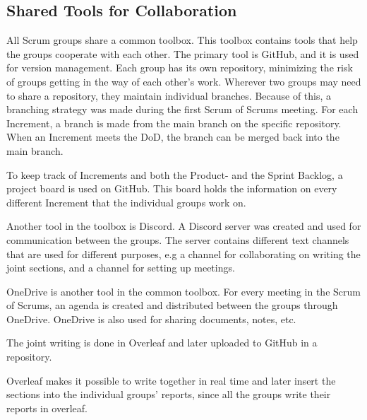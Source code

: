 \subsection{Shared Tools for Collaboration}\label{sub:shared-tools-for-collaboration}
All Scrum groups share a common toolbox.
This toolbox contains tools that help the groups cooperate with each other.
The primary tool is GitHub, and it is used for version management.  
Each group has its own repository, minimizing the risk of groups getting in the way of each other's work.
Wherever two groups may need to share a repository, they maintain individual branches.
Because of this, a branching strategy was made during the first Scrum of Scrums meeting.
For each Increment, a branch is made from the main branch on the specific repository. 
When an Increment meets the DoD, the branch can be merged back into the main branch.

To keep track of Increments and both the Product- and the Sprint Backlog, a project board is used on GitHub.
This board holds the information on every different Increment that the individual groups work on.

Another tool in the toolbox is Discord.
A Discord server was created and used for communication between the groups.
The server contains different text channels that are used for different purposes, e.g a channel for collaborating on writing the joint sections, and a channel for setting up meetings.

OneDrive is another tool in the common toolbox.
For every meeting in the Scrum of Scrums, an agenda is created and distributed between the groups through OneDrive.
OneDrive is also used for sharing documents, notes, etc.

The joint writing is done in Overleaf and later uploaded to GitHub in a repository.

Overleaf makes it possible to write together in real time and later insert the sections into the individual groups' reports, since all the groups write their reports in overleaf.

